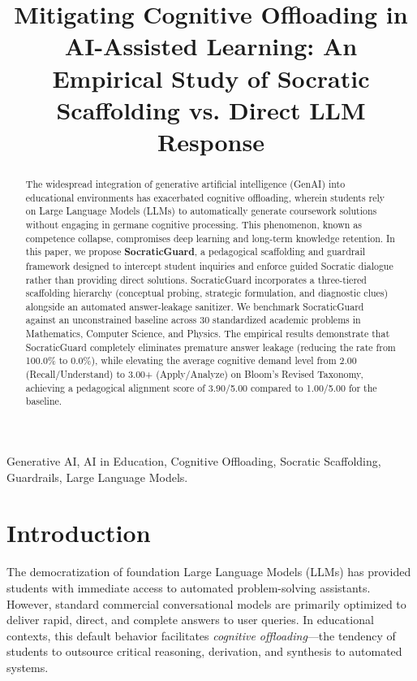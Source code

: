 \documentclass[conference]{IEEEtran}
\begin{document}
\title{Mitigating Cognitive Offloading in AI-Assisted Learning: An Empirical Study of Socratic Scaffolding vs. Direct LLM Response}

\author{
}

\maketitle

\begin{abstract}
The widespread integration of generative artificial intelligence (GenAI) into educational environments has exacerbated cognitive offloading, wherein students rely on Large Language Models (LLMs) to automatically generate coursework solutions without engaging in germane cognitive processing. This phenomenon, known as competence collapse, compromises deep learning and long-term knowledge retention. In this paper, we propose \textbf{SocraticGuard}, a pedagogical scaffolding and guardrail framework designed to intercept student inquiries and enforce guided Socratic dialogue rather than providing direct solutions. SocraticGuard incorporates a three-tiered scaffolding hierarchy (conceptual probing, strategic formulation, and diagnostic clues) alongside an automated answer-leakage sanitizer. We benchmark SocraticGuard against an unconstrained baseline across 30 standardized academic problems in Mathematics, Computer Science, and Physics. The empirical results demonstrate that SocraticGuard completely eliminates premature answer leakage (reducing the rate from 100.0\% to 0.0\%), while elevating the average cognitive demand level from 2.00 (Recall/Understand) to 3.00+ (Apply/Analyze) on Bloom's Revised Taxonomy, achieving a pedagogical alignment score of 3.90/5.00 compared to 1.00/5.00 for the baseline.
\end{abstract}

\begin{IEEEkeywords}
Generative AI, AI in Education, Cognitive Offloading, Socratic Scaffolding, Guardrails, Large Language Models.
\end{IEEEkeywords}

\section{Introduction}
The democratization of foundation Large Language Models (LLMs) has provided students with immediate access to automated problem-solving assistants. However, standard commercial conversational models are primarily optimized to deliver rapid, direct, and complete answers to user queries. In educational contexts, this default behavior facilitates \textit{cognitive offloading}---the tendency of students to outsource critical reasoning, derivation, and synthesis to automated systems.
\end{document}
